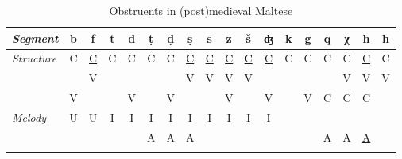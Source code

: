 \documentclass[output=paper]{langsci/langscibook}
\begin{document}
\begin{table}[t]
\begin{tabularx}{.9\textwidth}{X @{~}c@{~}c@{~}c@{~}c@{~}c@{~}c c@{~}c@{~}c@{~}c@{~}c c@{~}c@{~}c@{~}c@{~}c@{~}c}
\lsptoprule
{\em Segment}	& {\bf	b	} & {\bf	f	} & {\bf	t	} & {\bf	d	} & {\bf	ṭ	} & {\bf	ḍ	} & {\bf	ṣ	} & {\bf	s	} & {\bf	z	} & {\bf	š	} & {\bf	ʤ	} & {\bf	k	} & {\bf	g	} & {\bf	q	} & {\bf	χ	} & {\bf	ħ	} & {\bf	h} \\
\midrule
 \multirow{3}{*}{\em Structure} & C & \underline{C}	&	C	&	C	&	C	&	C	&	\underline{C}	&	\underline{C}	&	\underline{C}	& \underline{C}	&	\underline{C}	&	C	&	C	&	C	&	C	&	\underline{C}	&	C \\
		&		&	V	&		&		&		&		&	V	&	V	&	V	&	V	&		&		&		&		&	V	&	V	&	V \\
 		&	V	&		&		&	V	&		&	V	&		&		&	V	&		&	V	&		&	V	&	C	&	C	&	C	&	\\
\midrule        
\multirow{2}{*}{\em Melody}		&	U	&	U	&	I	&	I	&	I	&	I	&	I	&	I	&	I	&	\underline{I}	&	\underline{I}	&		&		&		&		&		&	\\
		&		&		&		&		&	A	&	A	&	A	&		&		&		&		&		&		&	A	&	A	&	\underline{A}	&	\\
\lspbottomrule
\end{tabularx}
\caption{Obstruents in (post)medieval Maltese}
\label{tab:puech:1}
\end{table}

\end{document}
